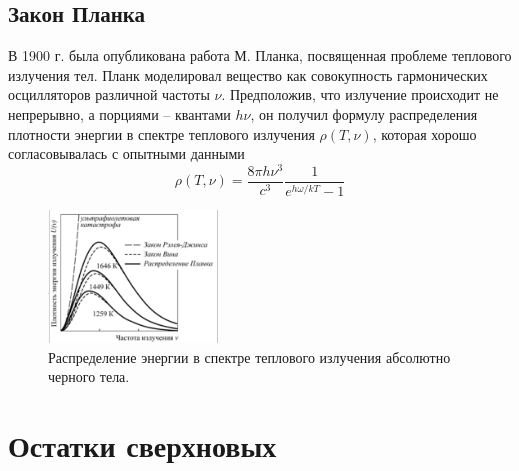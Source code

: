 \documentclass[a4paper,12pt]{extarticle}
\begin{document}
\subsection{Закон Планка}
В 1900 г. была опубликована работа М. Планка, посвященная проблеме теплового излучения тел. Планк моделировал вещество как совокупность гармонических осцилляторов различной частоты $\nu$. Предположив, что излучение происходит не непрерывно, а порциями – квантами $h\nu$, он получил формулу распределения плотности энергии в спектре теплового излучения $\rho(T,\nu)$, которая хорошо согласовывалась с опытными данными
$$\rho(T,\nu)=\frac{8\pi h\nu^3}{c^3}\frac{1}{e^{h\omega/kT}-1}$$

\begin{figure}[!htb]
	\centering
	\includegraphics[width=0.4\textwidth]{energy_distribution_in_spectrum.png}
	\caption{
		Распределение энергии в спектре теплового излучения абсолютно черного тела.
	}
	\label{fig:energy_distribution_in_spectrum}
\end{figure}

\subsection{}
\section{Остатки сверхновых}
\end{document}
